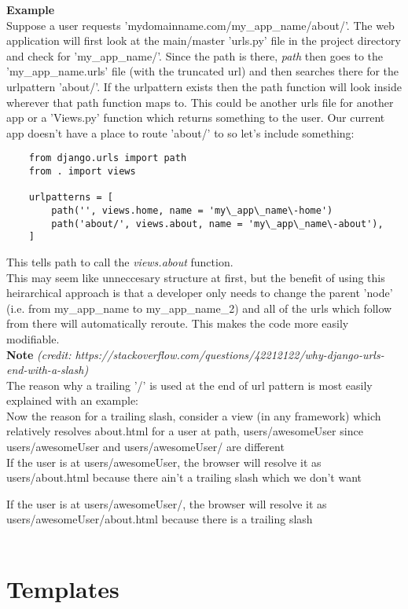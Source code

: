 \documentclass{article}%
\begin{document}
\textbf{Example}\\ Suppose a user requests 'mydomainname.com/my\_app\_name/about/'. The web application will first look at the main/master 'urls.py' file in the project directory and check for 'my\_app\_name/'. Since the path is there, \textit{path} then goes to the 'my\_app\_name.urls' file (with the truncated url) and then
searches there for the urlpattern 'about/'. If the urlpattern exists then the path function will look inside wherever that path function maps to. This could be another urls file for another app or a 'Views.py' function which returns something to the user. Our current app doesn't have a place to route 'about/' to so let's include something:
\begin{lstlisting}
    from django.urls import path
    from . import views

    urlpatterns = [
        path('', views.home, name = 'my\_app\_name\-home')
        path('about/', views.about, name = 'my\_app\_name\-about'),
    ]
\end{lstlisting}
This tells path to call the \textit{views.about} function. \\

This may seem like unneccesary structure at first, but the benefit of using this heirarchical approach is that a developer only needs to change the parent 'node' (i.e. from my\_app\_name to my\_app\_name\_2) and all of the urls which follow from there will automatically reroute. This makes the code more easily modifiable. \\

\textbf{Note} \textit{(credit: https://stackoverflow.com/questions/42212122/why-django-urls-end-with-a-slash)} \\ 

\noindent The reason why a trailing '/' is used at the end of url pattern is most easily explained with an example: \\

\noindent Now the reason for a trailing slash, consider a view (in any framework) which relatively resolves about.html for a user at path, users/awesomeUser
since users/awesomeUser and users/awesomeUser/ are different \\ 

\noindent If the user is at users/awesomeUser, the browser will resolve it as users/about.html because there ain't a trailing slash which we don't want

\noindent If the user is at users/awesomeUser/, the browser will resolve it as users/awesomeUser/about.html because there is a trailing slash \\ \\

\section{Templates}
\end{document}
